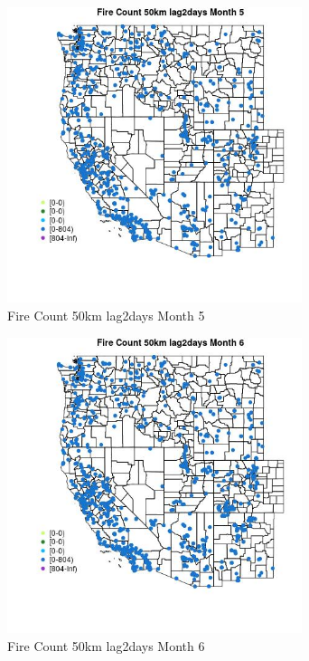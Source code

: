 \begin{figure} 
\centering  
\includegraphics[width=0.77\textwidth]{Code_Outputs/Report_ML_input_PM25_Step4_part_f_de_duplicated_aveswNAs_MapObsMo5Fire_Count_50km_lag2days.jpg} 
\caption{\label{fig:Report_ML_input_PM25_Step4_part_f_de_duplicated_aveswNAsMapObsMo5Fire_Count_50km_lag2days}Fire Count 50km lag2days Month 5} 
\end{figure} 
 

\begin{figure} 
\centering  
\includegraphics[width=0.77\textwidth]{Code_Outputs/Report_ML_input_PM25_Step4_part_f_de_duplicated_aveswNAs_MapObsMo6Fire_Count_50km_lag2days.jpg} 
\caption{\label{fig:Report_ML_input_PM25_Step4_part_f_de_duplicated_aveswNAsMapObsMo6Fire_Count_50km_lag2days}Fire Count 50km lag2days Month 6} 
\end{figure} 
 


